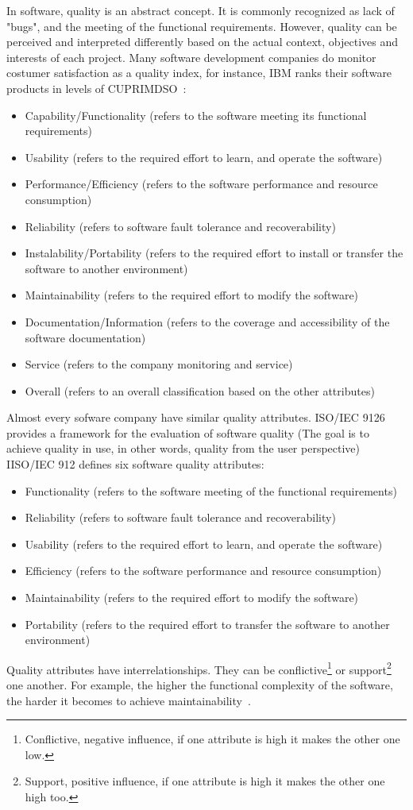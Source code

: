 \documentclass[sle]{llncs}
\begin{document}
In software, quality is an abstract concept. It is commonly recognized as lack of "bugs", and the meeting of the functional requirements.
However, quality can be perceived and interpreted differently based on the actual context, objectives and interests of each project.
Many software development companies do monitor costumer satisfaction as a quality index, 
for instance, IBM ranks their software products in levels of CUPRIMDSO~\cite{kan2002metrics}:
\begin{itemize}
\item Capability/Functionality (refers to the software meeting its functional requirements)
\item Usability (refers to the required effort to learn, and operate the software)
\item Performance/Efficiency (refers to the software performance and resource consumption)
\item Reliability (refers to software fault tolerance and recoverability)
\item Instalability/Portability (refers to the required effort to install or transfer the software to another environment)
\item Maintainability (refers to the required effort to modify the software)
\item Documentation/Information (refers to the coverage and accessibility of the software documentation)
\item Service (refers to the company monitoring and service)
\item Overall (refers to an overall classification based on the other attributes)
\end{itemize}
Almost every sofware company have similar quality attributes.
ISO/IEC 9126 provides a framework for the evaluation of software quality (The goal is to achieve quality in use, in other words, quality from the user perspective)~\cite{bevan1999quality}
IISO/IEC 912 defines six software quality attributes:
\begin{itemize}
\item Functionality (refers to the software meeting of the functional requirements)
\item Reliability (refers to software fault tolerance and recoverability)
\item Usability (refers to the required effort to learn, and operate the software)
\item Efficiency (refers to the software performance and resource consumption)
\item Maintainability (refers to the required effort to modify the software)
\item Portability (refers to the required effort to transfer the software to another environment)
\end{itemize}
Quality attributes have interrelationships. 
They can be 
conflictive\footnote{Conflictive, negative influence, if one attribute is high it makes the other one low.} or 
support\footnote{Support, positive influence, if one attribute is high it makes the other one high too.} one another. 
For example, the higher the functional complexity of the software, the harder it becomes to achieve maintainability~\cite{kan2002metrics}.
\end{document}
